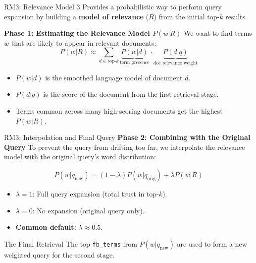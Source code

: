 \documentclass[aspectratio=169]{beamer}
\newif\ifanimated
\newcommand{\cpause}{\ifanimated\pause\fi}
\begin{document}
\begin{frame}{RM3: Relevance Model 3}
Provides a probabilistic way to perform query expansion by building a \textbf{model of relevance} ($R$) from the initial top-$k$ results.

\vspace{0.5em}

\textbf{Phase 1: Estimating the Relevance Model $P(w|R)$}
We want to find terms $w$ that are likely to appear in relevant documents:
$$P(w|R) \approx \sum_{d \in \text{top-}k} \underbrace{P(w|d)}_{\text{term presence}} \cdot \underbrace{P(d|q)}_{\text{doc relevance weight}}$$

\begin{itemize}
    \item $P(w|d)$ is the smoothed language model of document $d$.
    \item $P(d|q)$ is the score of the document from the first retrieval stage.
    \item Terms common across many high-scoring documents get the highest $P(w|R)$.
\end{itemize}
\end{frame}

\begin{frame}{RM3: Interpolation and Final Query}
\textbf{Phase 2: Combining with the Original Query}
To prevent the query from drifting too far, we interpolate the relevance model with the original query's word distribution:

\begin{tcolorbox}[colback=blue!5, colframe=blue!50, title=RM3 Linear Interpolation]
$$P(w|q_{\text{new}}) = (1-\lambda) P(w|q_{\text{orig}}) + \lambda P(w|R)$$
\end{tcolorbox}

\begin{itemize}
    \item $\lambda=1$: Full query expansion (total trust in top-$k$).
    \item $\lambda=0$: No expansion (original query only).
    \item \textbf{Common default:} $\lambda \approx 0.5$.
\end{itemize}\cpause

\vspace{0.5em}

\begin{exampleblock}{The Final Retrieval}
The top \texttt{fb\_terms} from $P(w|q_{\text{new}})$ are used to form a new weighted query for the second stage.
\end{exampleblock}
\end{frame}
\end{document}
